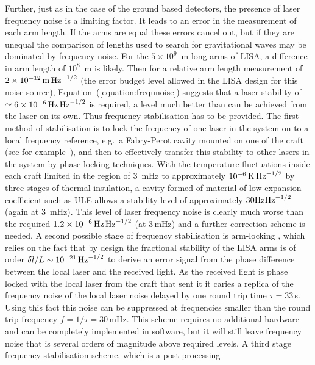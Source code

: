 \documentclass{article}
\begin{document}
Further, just as in the case of the ground based detectors, the presence of
laser frequency noise is a limiting factor. It leads to an error in the
measurement of each arm length. If the arms are equal these errors cancel out,
but if they are unequal the comparison of lengths used to search for
gravitational waves may be dominated by frequency noise. For the
$5\times10^9$~m long arms of LISA, a difference in arm length of $10^8$~m is 
likely. Then for a relative arm length measurement of $2 \times 10^{-12}\,{\rm
m}\,{\rm Hz}^{-1/2}$ (the error budget level allowed in the LISA design for this
noise source), Equation~(\ref{equation:frequnoise}) suggests that a laser
stability of $\simeq 6 \times 10^{-6}\,{\rm Hz}\,{\rm Hz}^{-1/2}$ is required, a
level much better than can be achieved from the laser on its own. Thus frequency
stabilisation has to be provided. The first method of stabilisation is to lock
the frequency of one laser in the system on to a local frequency reference, 
e.g.\ a Fabry-Perot cavity mounted on one of the craft (see for
example~\cite{McNamara}), and then to effectively transfer this stability to
other lasers in the system by phase locking techniques. With the temperature
fluctuations inside each craft limited in the region of 3~mHz to
approximately $10^{-6}\,{\rm K}\,{\rm Hz}^{-1/2}$ by three stages of thermal
insulation, a cavity formed of material of low expansion coefficient such as ULE
allows a stability level of approximately $30 {\rm Hz}{\rm Hz}^{-1/2}$ (again
at 3~mHz). This level of laser frequency noise is clearly much worse than the
required $1.2 \times 10^{-6}\,{\rm Hz}\,{\rm Hz}^{-1/2}$ (at 3\,mHz) and a
further correction scheme is needed. A second possible stage of frequency
stabilisation is arm-locking \cite{Sheard:2003}, which relies on the fact that
by design the fractional stability of the LISA arms is of order $\delta{}l/L
\sim 10^{-21}\,{\rm Hz}^{-1/2}$ to derive an error signal from the phase 
difference between the local laser and the received light. As the received light
is phase locked with the local laser from the craft that sent it it caries a
replica of the frequency noise of the local laser noise delayed by one round
trip time $\tau=33$\,s. Using this fact this noise can be suppressed at frequencies smaller
than the round trip frequency $f= 1/\tau = 30$\,mHz. This scheme requires no
additional hardware and can be completely implemented in software, but it will
still leave frequency noise that is several orders of magnitude above required
levels. A third stage frequency stabilisation scheme, which is a post-processing
\end{document}
